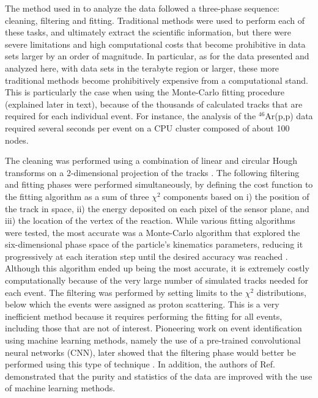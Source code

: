 \documentclass[review,sort&compress]{elsarticle}
\begin{document}
The method used in \cite{Bradt2018} to analyze the data followed a three-phase sequence: cleaning, filtering and fitting. Traditional methods were used to perform each of these tasks, and ultimately extract the scientific information, but there were severe limitations and high computational costs that become prohibitive in data sets larger by an order of magnitude.  In particular, as for the data presented and analyzed here, with data sets in the terabyte region or larger, these more traditional methods become prohibitively expensive from a computational stand. This is particularly the case when using the Monte-Carlo fitting procedure (explained later in text), because of the thousands of calculated tracks that are required for each individual event. For instance, the analysis of the $^{46}$Ar(p,p) data required several seconds per event on a CPU cluster composed of about 100 nodes.

The cleaning was performed using a combination of linear and circular Hough transforms on a 2-dimensional projection of the tracks \cite{Bradt2017}. The following filtering and fitting phases were performed simultaneously, by defining the cost function to the fitting algorithm as a sum of three $\chi^2$ components based on i) the position of the track in space, ii) the energy deposited on each pixel of the sensor plane, and iii) the location of the vertex of the reaction. While various fitting algorithms were tested, the most accurate was a Monte-Carlo algorithm that explored the six-dimensional phase space of the particle's kinematics parameters, reducing it progressively at each iteration step until the desired accuracy was reached \cite{Bradt2017}. Although this algorithm ended up being the most accurate, it is extremely costly computationally because of the very large number of simulated tracks needed for each event. The filtering was performed by setting limits to the $\chi^2$ distributions, below which the events were assigned as proton scattering. This is a very inefficient method because it requires performing the fitting for all events, including those that are not of interest. Pioneering work on event identification using machine learning methods, namely the use of a pre-trained convolutional neural networks (CNN), later showed that the filtering phase would better be performed using this type of technique \cite{Kuchera2019}. 
In addition, the authors of Ref.~\cite{Kuchera2019} demonstrated that the purity and statistics of the data are improved with the use of machine learning methods.
\end{document}
